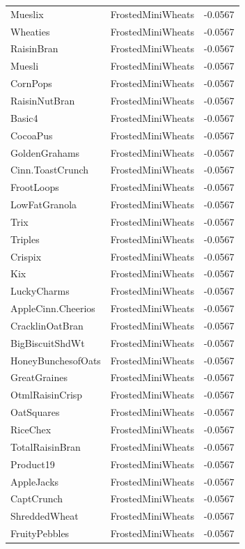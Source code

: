 \begin{table}[!htbp]
\begin{tabular}{lll}
\\
Mueslix & FrostedMiniWheats & -0.0567
\\
Wheaties & FrostedMiniWheats & -0.0567
\\
RaisinBran & FrostedMiniWheats & -0.0567
\\
Muesli & FrostedMiniWheats & -0.0567
\\
CornPops & FrostedMiniWheats & -0.0567
\\
RaisinNutBran & FrostedMiniWheats & -0.0567
\\
Basic4 & FrostedMiniWheats & -0.0567
\\
CocoaPus & FrostedMiniWheats & -0.0567
\\
GoldenGrahams & FrostedMiniWheats & -0.0567
\\
Cinn.ToastCrunch & FrostedMiniWheats & -0.0567
\\
FrootLoops & FrostedMiniWheats & -0.0567
\\
LowFatGranola & FrostedMiniWheats & -0.0567
\\
Trix & FrostedMiniWheats & -0.0567
\\
Triples & FrostedMiniWheats & -0.0567
\\
Crispix & FrostedMiniWheats & -0.0567
\\
Kix & FrostedMiniWheats & -0.0567
\\
LuckyCharms & FrostedMiniWheats & -0.0567
\\
AppleCinn.Cheerios & FrostedMiniWheats & -0.0567
\\
CracklinOatBran & FrostedMiniWheats & -0.0567
\\
BigBiscuitShdWt & FrostedMiniWheats & -0.0567
\\
HoneyBunchesofOats & FrostedMiniWheats & -0.0567
\\
GreatGraines & FrostedMiniWheats & -0.0567
\\
OtmlRaisinCrisp & FrostedMiniWheats & -0.0567
\\
OatSquares & FrostedMiniWheats & -0.0567
\\
RiceChex & FrostedMiniWheats & -0.0567
\\
TotalRaisinBran & FrostedMiniWheats & -0.0567
\\
Product19 & FrostedMiniWheats & -0.0567
\\
AppleJacks & FrostedMiniWheats & -0.0567
\\
CaptCrunch & FrostedMiniWheats & -0.0567
\\
ShreddedWheat & FrostedMiniWheats & -0.0567
\\
FruityPebbles & FrostedMiniWheats & -0.0567

\end{tabular}
\end{table}
